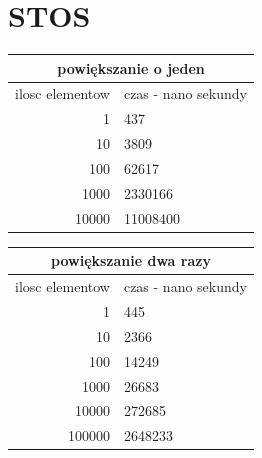 \documentclass[a4paper,11pt]{report}
\begin{document}
\section{STOS}
\begin{tabular}{|rl|}
\hline
\multicolumn{2}{|c|}{powiększanie o jeden}\\
\hline
ilosc elementow & czas - nano sekundy\\
\hline
1&437\\
10&3809\\
100&62617\\
1000&2330166\\
10000&11008400\\
\hline
\end{tabular}
\newline
\newline
\newline
\begin{tabular}{|rl|}
\hline
\multicolumn{2}{|c|}{powiększanie dwa razy}\\
\hline
ilosc elementow & czas - nano sekundy\\
\hline
1&445\\
10&2366\\
100&14249\\
1000&26683\\
10000&272685\\
100000&2648233\\
\hline
\end{tabular}
\newline
\newline
\end{document}
